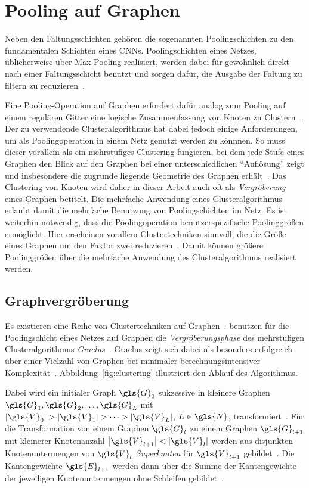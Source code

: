 \section{Pooling auf Graphen}
\label{pooling}

Neben den Faltungsschichten gehören die sogenannten Poolingschichten zu den fundamentalen Schichten eines \glspl{CNN}.
Poolingschichten eines Netzes, üblicherweise über Max-Pooling realisiert, werden dabei für gewöhnlich direkt nach einer Faltungsschicht benutzt und sorgen dafür, die Ausgabe der Faltung zu filtern \bzw{} zu reduzieren~\cite{Nielsen}.

Eine Pooling-Operation auf Graphen erfordert dafür analog zum Pooling auf einem regulären Gitter eine logische Zusammenfassung von Knoten zu Clustern~\cite{Defferrard}.
Der zu verwendende Clusteralgorithmus hat dabei jedoch einige Anforderungen, um als Poolingoperation in einem Netz genutzt werden zu könnnen.
So muss dieser vorallem als ein mehrstufiges Clustering fungieren, bei dem jede Stufe eines Graphen den Blick auf den Graphen bei einer unterschiedlichen \enquote{Auflösung} zeigt und insbesondere die zugrunde liegende Geometrie des Graphen erhält~\cite{Defferrard}.
Das Clustering von Knoten wird daher in dieser Arbeit auch oft als \emph{Vergröberung} eines Graphen betitelt.
Die mehrfache Anwendung eines Clusteralgorithmus erlaubt damit die mehrfache Benutzung von Poolingschichten im Netz.
Es ist weiterhin notwendig, dass die Poolingoperation benutzerspezifische Poolinggrößen ermöglicht.
Hier erscheinen vorallem Clustertechniken sinnvoll, die die Größe eines Graphen um den Faktor zwei reduzieren~\cite{Defferrard}.
Damit können größere Poolinggrößen über die mehrfache Anwendung des Clusteralgorithmus realisiert werden.

\subsection{Graphvergröberung}
\label{graphvergroeberung}

Es existieren eine Reihe von Clustertechniken auf Graphen~\cite{Luxburg, graclus, Defferrard}.
\citeauthor{Defferrard} benutzen für die Poolingschicht eines Netzes auf Graphen die \emph{Vergröberungsphase} des mehrstufigen Clusteralgorithmus \emph{Graclus}~\cite{graclus}.
Graclus zeigt sich dabei als besonders erfolgreich über einer Vielzahl von Graphen bei minimaler berechnungsintensiver Komplexität~\cite{Defferrard}.
Abbildung~\ref{fig:clustering} illustriert den Ablauf des Algorithmus.

Dabei wird ein initialer Graph $\gls{G}_0$ sukzessive in kleinere Graphen $\gls{G}_1, \gls{G}_2, \ldots, \gls{G}_L$ mit $\left|\gls{V}_0\right| > \left|\gls{V}_1\right| > \cdots > |\gls{V}_L|$, $L \in \gls{N}$, transformiert~\cite{graclus}.
Für die Transformation von einem Graphen $\gls{G}_l$ zu einem Graphen $\gls{G}_{l+1}$ mit kleinerer Knotenanzahl $\left|\gls{V}_{l+1}\right| < \left|\gls{V}_l\right|$ werden aus disjunkten Knotenuntermengen von $\gls{V}_l$ \emph{Superknoten} für $\gls{V}_{l+1}$ gebildet~\cite{graclus}.
Die Kantengewichte $\gls{E}_{l+1}$ werden dann über die Summe der Kantengewichte der jeweiligen Knotenuntermengen ohne Schleifen gebildet~\cite{graclus}.


